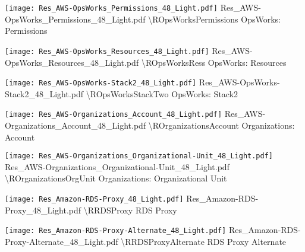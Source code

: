  {\texttt{[image: Res\_AWS-OpsWorks\_Permissions\_48\_Light.pdf]}} {Res\_AWS-OpsWorks\_Permissions\_48\_Light.pdf} {{\textbackslash}ROpsWorksPermissions} {OpsWorks: Permissions}

 {\texttt{[image: Res\_AWS-OpsWorks\_Resources\_48\_Light.pdf]}} {Res\_AWS-OpsWorks\_Resources\_48\_Light.pdf} {{\textbackslash}ROpsWorksRess} {OpsWorks: Resources}

 {\texttt{[image: Res\_AWS-OpsWorks-Stack2\_48\_Light.pdf]}} {Res\_AWS-OpsWorks-Stack2\_48\_Light.pdf} {{\textbackslash}ROpsWorksStackTwo} {OpsWorks: Stack2}

 {\texttt{[image: Res\_AWS-Organizations\_Account\_48\_Light.pdf]}} {Res\_AWS-Organizations\_Account\_48\_Light.pdf} {{\textbackslash}ROrganizationsAccount} {Organizations: Account}

 {\texttt{[image: Res\_AWS-Organizations\_Organizational-Unit\_48\_Light.pdf]}} {Res\_AWS-Organizations\_Organizational-Unit\_48\_Light.pdf} {{\textbackslash}ROrganizationsOrgUnit} {Organizations: Organizational Unit}

 {\texttt{[image: Res\_Amazon-RDS-Proxy\_48\_Light.pdf]}} {Res\_Amazon-RDS-Proxy\_48\_Light.pdf} {{\textbackslash}RRDSProxy} {RDS Proxy}

 {\texttt{[image: Res\_Amazon-RDS-Proxy-Alternate\_48\_Light.pdf]}} {Res\_Amazon-RDS-Proxy-Alternate\_48\_Light.pdf} {{\textbackslash}RRDSProxyAlternate} {RDS Proxy Alternate}

